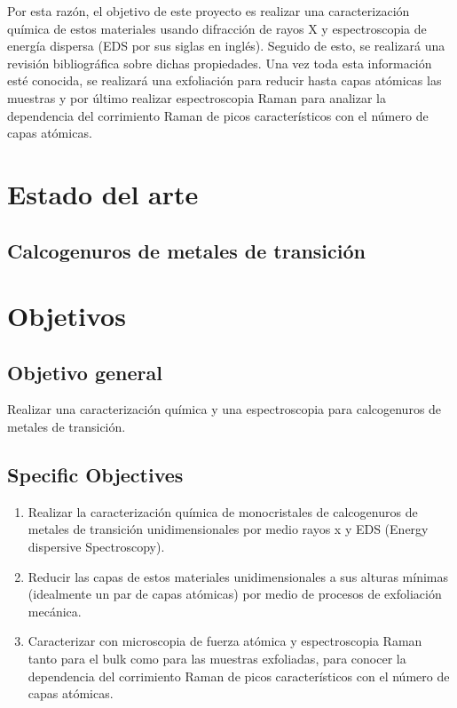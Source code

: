 \documentclass{article}
\begin{document}
Por esta razón, el objetivo de este proyecto es realizar una caracterización química de estos materiales usando difracción de rayos X y espectroscopia de energía dispersa (EDS por sus siglas en inglés). Seguido de esto, se realizará una revisión bibliográfica sobre dichas propiedades. Una vez toda esta información esté conocida, se realizará una exfoliación para reducir hasta capas atómicas las muestras y por último realizar espectroscopia Raman para analizar la dependencia del corrimiento Raman de picos característicos con el número de capas atómicas.

\section{Estado del arte}
\subsection{Calcogenuros de metales de transición}



\section{Objetivos}
\subsection{Objetivo general}

Realizar una caracterización química y una espectroscopia para calcogenuros de metales de transición.

\subsection{Specific Objectives}

\begin{enumerate}
    \item Realizar la caracterización química de monocristales de calcogenuros de metales de transición unidimensionales por medio rayos x y EDS (Energy dispersive Spectroscopy).
    \item Reducir las capas de estos materiales unidimensionales a sus alturas mínimas (idealmente un par de capas atómicas) por medio de procesos de exfoliación mecánica.
    \item Caracterizar con microscopia de fuerza atómica y espectroscopia Raman tanto para el bulk como para las muestras exfoliadas, para conocer la dependencia del corrimiento Raman de picos característicos con el número de capas atómicas.
\end{enumerate}
\end{document}
